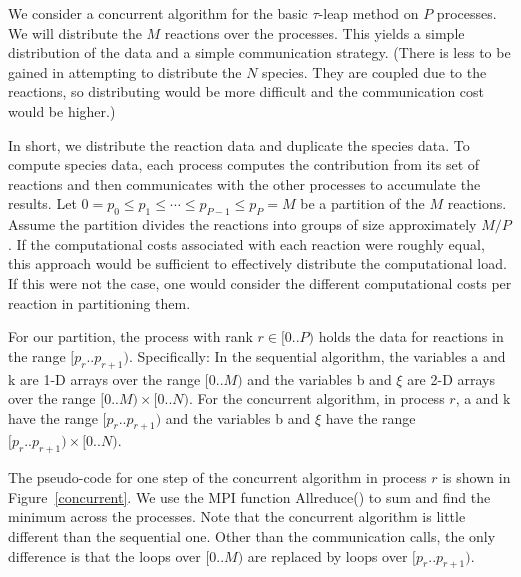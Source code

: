 \documentclass[letterpaper]{article}
\begin{document}
We consider a concurrent algorithm for the basic $\tau$-leap method on 
$P$ processes.  We will distribute the $M$ reactions over the processes.
This yields a simple distribution of the data and a simple communication 
strategy.  (There is less to be gained in attempting to distribute the 
$N$ species.  They are coupled due to the reactions, so distributing would
be more difficult and the communication cost would be higher.)  

In short, we distribute the reaction data and duplicate the species data.
To compute species data, each process computes the contribution from its 
set of reactions and then communicates with the other processes to 
accumulate the results.  Let 
$0 = p_0 \leq p_1 \leq \cdots \leq p_{P-1} \leq p_P = M$ be a partition of
the $M$ reactions.  Assume the partition divides the reactions into groups
of size approximately $M / P$.  If the computational costs associated with
each reaction were roughly equal, this approach would be sufficient to 
effectively distribute the computational load.  If this were not the case,
one would consider the different computational costs per reaction in
partitioning them.

For our partition, the process with rank $r \in [0..P)$ holds 
the data for reactions in the range $[p_r..p_{r+1})$.
Specifically: In the sequential algorithm, the variables a and k are 1-D
arrays over the range $[0..M)$ and the variables b and $\xi$ are 2-D 
arrays over the range $[0..M) \times [0..N)$.  For the concurrent algorithm,
in process $r$, a and k have the range $[p_r..p_{r+1})$ and the variables 
b and $\xi$ have the range $[p_r..p_{r+1}) \times [0..N)$.



The pseudo-code for one step of the concurrent algorithm in process $r$ 
is shown in Figure~\ref{concurrent}.
We use the MPI function Allreduce() 
\cite{mpi}
to sum and find the minimum across the 
processes.  Note that the concurrent algorithm is little different than the
sequential one.  Other than the communication calls, the only difference
is that the loops over $[0..M)$ are replaced by loops over
$[p_r..p_{r+1})$.
\end{document}
